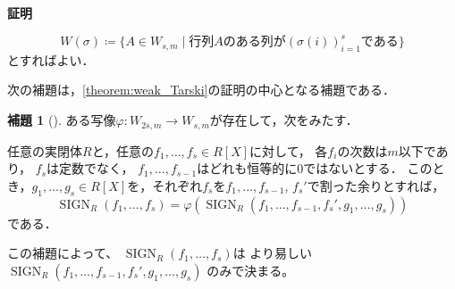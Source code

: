 \documentclass[uplatex, dvipdfmx]{jsarticle}
\makeatletter
\numberwithin{equation}{section}
\renewenvironment{proof}[1][\proofname]{\par
  \pushQED{\qed}%
  \normalfont \topsep6\p@\@plus6\p@\relax
  \trivlist
  \item\relax
  {\bfseries
  #1\@addpunct{.}}\hspace\labelsep\ignorespaces
}{
  \popQED\endtrivlist\@endpefalse
}
\newcommand{\map}[3]{{#1}\colon{#2}\rightarrow{#3}}
\DeclareMathOperator{\SIGN}{SIGN}
\theoremstyle{definition}
\newtheorem{lemma}[definition]{補題}
\renewcommand{\proofname}{\textbf{証明}}
\makeatother
\begin{document}
\begin{proof}
     \begin{equation}
          W(\sigma)\coloneqq\{A \in W_{s,m} \mid \text{行列$A$のある列が$(\sigma(i))_{i=1}^s$である}\}
     \end{equation}
     とすればよい．
\end{proof}

次の補題は，\cref{theorem:weak_Tarski}の証明の中心となる補題である．

\begin{lemma}[{\cite[Lemma 1.4.5.]{MR1659509}}]\label{lemma:qe_lowering}
     ある写像$\map{\varphi}{W_{2s,m}}{W_{s,m}}$が存在して，次をみたす．

     任意の実閉体$R$と，任意の$f_1, \dots, f_s \in R[X]$に対して，
     各$f_i$の次数は$m$以下であり，
     $f_s$は定数でなく，
     $f_1, \dots, f_{s-1}$はどれも恒等的に$0$ではないとする．
     このとき，$g_1, \dots, g_s \in R[X]$を，それぞれ$f_s$を$f_1, \dots, f_{s-1}$, $f_s'$で割った余りとすれば，
     \begin{equation}
          \SIGN_R(f_1, \dots, f_s) = \varphi(\SIGN_R(f_1, \dots, f_{s-1}, f_s', g_1, \dots, g_s))
     \end{equation}
     である．
\end{lemma}

この補題によって、
$\SIGN_R(f_1, \dots, f_s)$は
より易しい
$
\SIGN_R(f_1, \dots, f_{s-1}, f_s', g_1, \dots, g_s)
$
のみで決まる。
\end{document}
